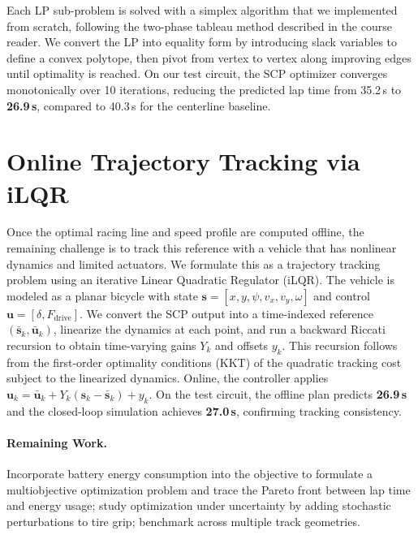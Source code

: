 \documentclass[twoside,11pt]{article}
\begin{document}
Each LP sub-problem is solved with a simplex algorithm that we implemented from scratch, following the two-phase tableau method described in the course reader. We convert the LP into equality form by introducing slack variables to define a convex polytope, then pivot from vertex to vertex along improving edges until optimality is reached. On our test circuit, the SCP optimizer converges monotonically over 10 iterations, reducing the predicted lap time from 35.2\,s to \textbf{26.9\,s}, compared to 40.3\,s for the centerline baseline.

\vspace{-0.05in}
\section{Online Trajectory Tracking via iLQR}
\vspace{-0.08in}

Once the optimal racing line and speed profile are computed offline, the remaining challenge is to track this reference with a vehicle that has nonlinear dynamics and limited actuators. We formulate this as a trajectory tracking problem using an iterative Linear Quadratic Regulator (iLQR). The vehicle is modeled as a planar bicycle with state $\mathbf{s} = [x, y, \psi, v_x, v_y, \omega]$ and control $\mathbf{u} = [\delta, F_{\text{drive}}]$. We convert the SCP output into a time-indexed reference $(\bar{\mathbf{s}}_k, \bar{\mathbf{u}}_k)$, linearize the dynamics at each point, and run a backward Riccati recursion to obtain time-varying gains $Y_k$ and offsets $y_k$. This recursion follows from the first-order optimality conditions (KKT) of the quadratic tracking cost subject to the linearized dynamics. Online, the controller applies $\mathbf{u}_k = \bar{\mathbf{u}}_k + Y_k(\mathbf{s}_k - \bar{\mathbf{s}}_k) + y_k$. On the test circuit, the offline plan predicts \textbf{26.9\,s} and the closed-loop simulation achieves \textbf{27.0\,s}, confirming tracking consistency.

\vspace{-0.05in}
\paragraph{Remaining Work.} Incorporate battery energy consumption into the objective to formulate a multiobjective optimization problem and trace the Pareto front between lap time and energy usage; study optimization under uncertainty by adding stochastic perturbations to tire grip; benchmark across multiple track geometries.
\end{document}
